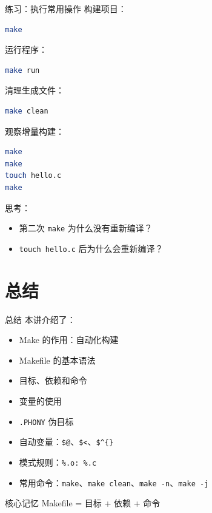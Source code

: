 \documentclass[aspectratio=169]{ctexbeamer}
\begin{document}
\begin{frame}{练习：执行常用操作}
构建项目：

\begin{lstlisting}[language=bash]
make
\end{lstlisting}

运行程序：

\begin{lstlisting}[language=bash]
make run
\end{lstlisting}

清理生成文件：

\begin{lstlisting}[language=bash]
make clean
\end{lstlisting}

观察增量构建：

\begin{lstlisting}[language=bash]
make
make
touch hello.c
make
\end{lstlisting}

思考：

\begin{itemize}
  \item 第二次 \texttt{make} 为什么没有重新编译？
  \item \texttt{touch hello.c} 后为什么会重新编译？
\end{itemize}
\end{frame}

\section{总结}

\begin{frame}[fragile]{总结}
本讲介绍了：

\begin{itemize}
  \item Make 的作用：自动化构建
  \item Makefile 的基本语法
  \item 目标、依赖和命令
  \item 变量的使用
  \item \texttt{.PHONY} 伪目标
  \item 自动变量：\texttt{\$@}、\texttt{\$<}、\texttt{\$\textasciicircum\{\}}
  \item 模式规则：\texttt{\%.o: \%.c}
  \item 常用命令：\texttt{make}、\texttt{make clean}、\texttt{make -n}、\texttt{make -j}
\end{itemize}

\begin{block}{核心记忆}
Makefile = 目标 + 依赖 + 命令
\end{block}
\end{frame}
\end{document}
